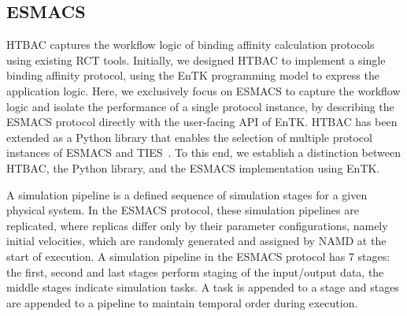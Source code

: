 \documentclass{bmcart}
\begin{document}

\subsection*{ESMACS}\label{sec:htbac}

HTBAC captures the workflow logic of binding affinity calculation protocols using existing RCT tools. Initially, we designed HTBAC to implement a single binding affinity protocol, using the EnTK programming model to express the application logic. Here, we exclusively focus on ESMACS to capture the workflow logic and isolate the performance of a single protocol instance, by describing the ESMACS protocol directly with the user-facing API of EnTK. HTBAC has been extended as a Python library that enables the selection of multiple protocol instances of ESMACS and TIES~\cite{dakka}. To this end, we establish a distinction between HTBAC, the Python library, and the ESMACS implementation using EnTK. 


A simulation pipeline is a defined sequence of simulation stages for a given
physical system. In the ESMACS protocol, these simulation pipelines are
replicated, where replicas differ only by their parameter configurations,
namely initial velocities, which are randomly generated and assigned by NAMD
at the start of execution. A simulation pipeline in the ESMACS protocol has 7
stages: the first, second and last stages perform staging of the input/output
data, the middle stages indicate simulation tasks. A task is appended to a
stage and stages are appended to a pipeline to maintain temporal order during
execution. 

\end{document}
